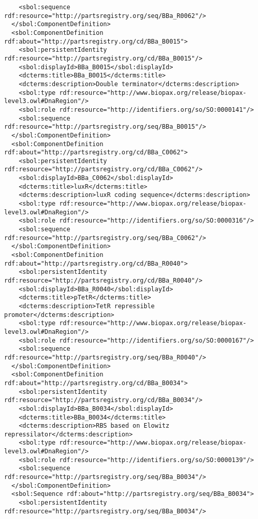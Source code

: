\begin{lstlisting}
    <sbol:sequence rdf:resource="http://partsregistry.org/seq/BBa_R0062"/>
  </sbol:ComponentDefinition>
  <sbol:ComponentDefinition rdf:about="http://partsregistry.org/cd/BBa_B0015">
    <sbol:persistentIdentity rdf:resource="http://partsregistry.org/cd/BBa_B0015"/>
    <sbol:displayId>BBa_B0015</sbol:displayId>
    <dcterms:title>BBa_B0015</dcterms:title>
    <dcterms:description>Double terminator</dcterms:description>
    <sbol:type rdf:resource="http://www.biopax.org/release/biopax-level3.owl#DnaRegion"/>
    <sbol:role rdf:resource="http://identifiers.org/so/SO:0000141"/>
    <sbol:sequence rdf:resource="http://partsregistry.org/seq/BBa_B0015"/>
  </sbol:ComponentDefinition>
  <sbol:ComponentDefinition rdf:about="http://partsregistry.org/cd/BBa_C0062">
    <sbol:persistentIdentity rdf:resource="http://partsregistry.org/cd/BBa_C0062"/>
    <sbol:displayId>BBa_C0062</sbol:displayId>
    <dcterms:title>luxR</dcterms:title>
    <dcterms:description>luxR coding sequence</dcterms:description>
    <sbol:type rdf:resource="http://www.biopax.org/release/biopax-level3.owl#DnaRegion"/>
    <sbol:role rdf:resource="http://identifiers.org/so/SO:0000316"/>
    <sbol:sequence rdf:resource="http://partsregistry.org/seq/BBa_C0062"/>
  </sbol:ComponentDefinition>
  <sbol:ComponentDefinition rdf:about="http://partsregistry.org/cd/BBa_R0040">
    <sbol:persistentIdentity rdf:resource="http://partsregistry.org/cd/BBa_R0040"/>
    <sbol:displayId>BBa_R0040</sbol:displayId>
    <dcterms:title>pTetR</dcterms:title>
    <dcterms:description>TetR repressible promoter</dcterms:description>
    <sbol:type rdf:resource="http://www.biopax.org/release/biopax-level3.owl#DnaRegion"/>
    <sbol:role rdf:resource="http://identifiers.org/so/SO:0000167"/>
    <sbol:sequence rdf:resource="http://partsregistry.org/seq/BBa_R0040"/>
  </sbol:ComponentDefinition>
  <sbol:ComponentDefinition rdf:about="http://partsregistry.org/cd/BBa_B0034">
    <sbol:persistentIdentity rdf:resource="http://partsregistry.org/cd/BBa_B0034"/>
    <sbol:displayId>BBa_B0034</sbol:displayId>
    <dcterms:title>BBa_B0034</dcterms:title>
    <dcterms:description>RBS based on Elowitz repressilator</dcterms:description>
    <sbol:type rdf:resource="http://www.biopax.org/release/biopax-level3.owl#DnaRegion"/>
    <sbol:role rdf:resource="http://identifiers.org/so/SO:0000139"/>
    <sbol:sequence rdf:resource="http://partsregistry.org/seq/BBa_B0034"/>
  </sbol:ComponentDefinition>
  <sbol:Sequence rdf:about="http://partsregistry.org/seq/BBa_B0034">
    <sbol:persistentIdentity rdf:resource="http://partsregistry.org/seq/BBa_B0034"/>

\end{lstlisting}
